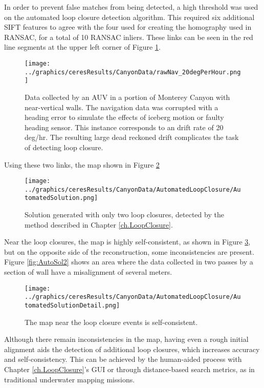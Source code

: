 In order to prevent false matches from being detected, a high threshold was used on the automated loop closure detection algorithm. This required six additional SIFT features to agree with the four used for creating the homography used in RANSAC, for a total of 10 RANSAC inliers. These links can be seen in the red line segments at the upper left corner of Figure \ref{fig:RealDataWithDrift}.

 \begin{figure}[!htb]
   \centering
   \texttt{[image: ../graphics/ceresResults/CanyonData/rawNav\_20degPerHour.png]} %
   \caption{Data collected by an AUV in a portion of Monterey Canyon with near-vertical walls. The navigation data was corrupted with a heading error to simulate the effects of iceberg motion or faulty heading sensor. This instance corresponds to an drift rate of 20 deg/hr. The resulting large dead reckoned drift complicates the task of detecting loop closure.}
   \label{fig:RealDataWithDrift}
\end{figure}

Using these two links, the map shown in Figure \ref{fig:AutoSol}

 \begin{figure}[!htb]
   \centering
   \texttt{[image: ../graphics/ceresResults/CanyonData/AutomatedLoopClosure/AutomatedSolution.png]} %
   \caption{Solution generated with only two loop closures, detected by the method described in Chapter \ref{ch.LoopClosure}.}
   \label{fig:AutoSol}
\end{figure}

Near the loop closures, the map is highly self-consistent, as shown in Figure \ref{fig:AutoSol1}, but on the opposite side of the reconstruction, some inconsistencies are present. Figure \ref{fig:AutoSol2} shows an area where the data collected in two passes by a section of wall have a misalignment of several meters.

 \begin{figure}[!htb]
   \centering
   \texttt{[image: ../graphics/ceresResults/CanyonData/AutomatedLoopClosure/AutomatedSolutionDetail.png]} %
   \caption{The map near the loop closure events is self-consistent.}
   \label{fig:AutoSol1}
\end{figure}

Although there remain inconsistencies in the map, having even a rough initial alignment aids the detection of additional loop closures, which increases accuracy and self-consistency. This can be achieved by the human-aided process with Chapter \ref{ch.LoopClosure}'s GUI or through distance-based search metrics, as in traditional underwater mapping missions.

